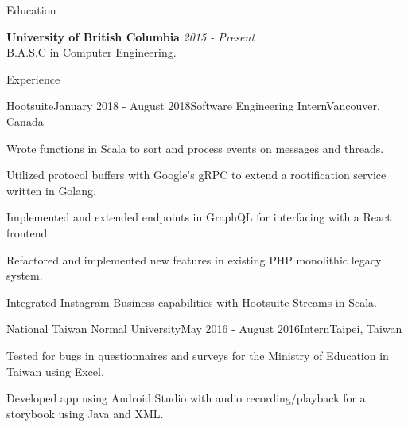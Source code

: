 \documentclass{resume} %
\begin{document}

\begin{rSection}{Education}

{\bf University of British Columbia} \hfill {\em 2015 - Present} \\ 
B.A.S.C in Computer Engineering.

\end{rSection}
\begin{rSection}{Experience}

  \begin{rSubsection}{Hootsuite}{January 2018 - August 2018}{Software Engineering Intern}{Vancouver, Canada}
\item Wrote functions in Scala to sort and process events on messages and threads.
\item Utilized protocol buffers with Google's gRPC to extend a rootification service written in Golang.
\item Implemented and extended endpoints in GraphQL for interfacing with a React frontend.
\item Refactored and implemented new features in existing PHP monolithic legacy system.
\item Integrated Instagram Business capabilities with Hootsuite Streams in Scala.  
\end{rSubsection}
\begin{rSubsection}{National Taiwan Normal University}{May 2016 - August 2016}{Intern}{Taipei, Taiwan}
\item Tested for bugs in questionnaires and surveys for the Ministry of Education in Taiwan using Excel.
\item Developed app using Android Studio with audio recording/playback for a storybook using Java and XML.
\end{rSubsection}

\end{rSection}


\end{document}
